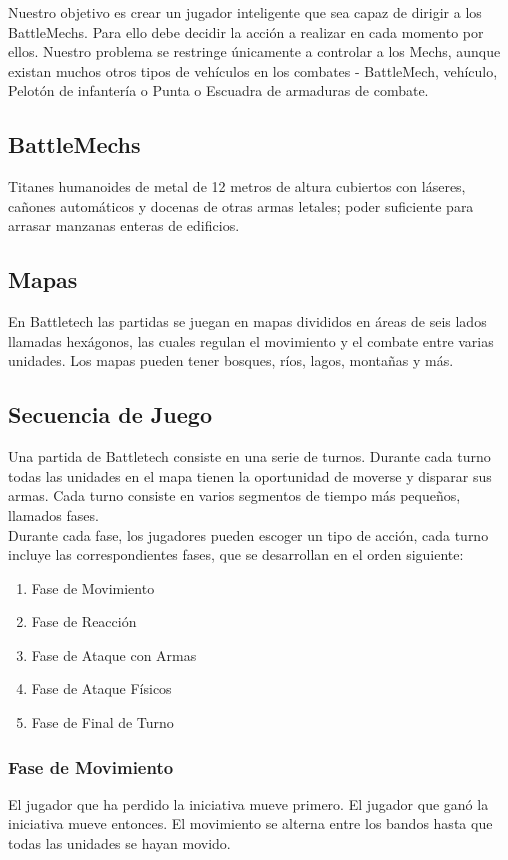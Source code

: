 \documentclass[a4paper,12pt,oneside]{book}
\begin{document}
Nuestro objetivo es crear un jugador inteligente que sea capaz de
dirigir a los BattleMechs. Para ello debe decidir la acción a
realizar en cada momento por ellos. Nuestro problema se restringe
únicamente a controlar a los Mechs, aunque existan muchos otros tipos
de vehículos en los combates - BattleMech, vehículo, Pelotón de
infantería o Punta o Escuadra de armaduras de combate.

\subsection{BattleMechs}
Titanes humanoides de metal de 12 metros de altura cubiertos con
láseres, cañones automáticos y docenas de otras armas letales; poder
suficiente para arrasar manzanas enteras de edificios. 

\subsection{Mapas}

En Battletech las partidas se juegan en mapas divididos en áreas de
seis lados llamadas hexágonos, las cuales regulan el movimiento y el
combate entre varias unidades. Los mapas pueden tener bosques, ríos,
lagos, montañas y más.

\subsection{Secuencia de Juego}

Una partida de Battletech consiste en una serie de turnos. Durante
cada turno todas las unidades en el mapa tienen la oportunidad de
moverse y disparar sus armas. Cada turno consiste en varios
segmentos de tiempo más pequeños, llamados fases.\\

Durante cada fase, los jugadores pueden escoger un tipo de acción,
cada turno incluye las correspondientes fases, que se desarrollan en
el orden siguiente:
\begin{enumerate}
\item Fase de Movimiento
\item Fase de Reacción
\item Fase de Ataque con Armas
\item Fase de Ataque Físicos
\item Fase de Final de Turno
\end{enumerate}

\subsubsection{ Fase de Movimiento }
El jugador que ha perdido la iniciativa mueve primero. El jugador que
ganó la iniciativa mueve entonces. El movimiento se alterna entre los
bandos hasta que todas las unidades se hayan movido. \\
\end{document}

